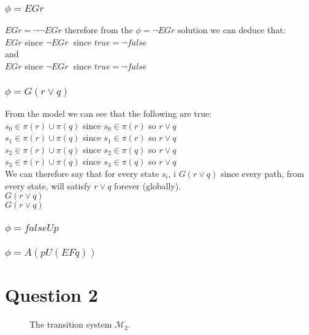 \documentclass[a4paper,10pt]{article}
\begin{document}
\subsubsection*{$\phi = EGr$}
$ EGr = \neg \neg EGr $ therefore from the $\phi = \neg EGr$ solution we can deduce that:\\[0.25cm]
 $EGr$ since  $\neg EGr\:$ since $true = \neg false$
\\[0.25cm]
and
\\[0.25cm]
 $EGr$ since  $\neg EGr\:$  since $true = \neg false$
\subsubsection*{$\phi = G(r \vee q)$}
From the model we can see that the following are true:
\\[0.25cm]
$s_0 \in \pi(r) \cup \pi(q) $ since $s_0 \in \pi(r)$ so  $r \vee q$
\\[0.25cm]
$s_1 \in \pi(r) \cup \pi(q) $ since $s_1 \in \pi(r)$ so  $r \vee q$
\\[0.25cm]
$s_2 \in \pi(r) \cup \pi(q) $ since $s_2 \in \pi(q)$ so  $r \vee q$
\\[0.25cm]
$s_3 \in \pi(r) \cup \pi(q) $ since $s_3 \in \pi(q)$ so  $r \vee q$
\\[0.25cm]
We can therefore say that for every state $s_i$, \holds i $G(r \vee q)$ since every path, from every state, will satisfy $r \vee q$ forever (globally).
\\[0.25cm]
 $G(r \vee q)$
\\[0.25cm]
 $G(r \vee q)$
\subsubsection*{$\phi = falseUp$}
\subsubsection*{$\phi = A(pU(EFq))$}

\newpage
\section*{Question 2}
\begin{figure}[H]
  \centering
  \caption{The transition system $\mathcal{M}_2$.}
  \label{fig:m2}
\end{figure}
\end{document}

